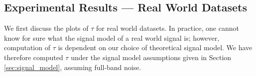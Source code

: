 \subsection{Experimental Results --- Real World Datasets}
\label{sec:LS:experiments_real}




We first discuss the plots of $\tau$ for real world datasets. In practice, one cannot know for sure what the signal model of a real world signal is; however, computation of $\tau$ is dependent on our choice of theoretical signal model. We have therefore computed $\tau$ under the signal model assumptions given in Section \ref{sec:signal_model}, assuming full-band noise.


